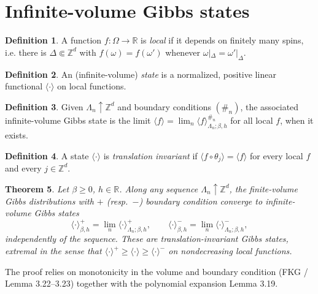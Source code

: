 \documentclass[11pt]{article}
\theoremstyle{plain}
\newtheorem{theorem}{Theorem}
\theoremstyle{definition}
\newtheorem{definition}[theorem]{Definition}
\theoremstyle{remark}
\newcommand{\Z}{\mathbb{Z}}
\newcommand{\R}{\mathbb{R}}
\newcommand{\fin}{\Subset}          %
\newcommand{\La}{\Lambda}
\newcommand{\bdy}{\#}
\newcommand{\avg}[1]{\langle #1 \rangle}
\newcommand{\meanp}[1]{\langle #1 \rangle^{+}}
\newcommand{\meanm}[1]{\langle #1 \rangle^{-}}
\begin{document}
\section{Infinite-volume Gibbs states}
\begin{definition}
A function $f:\Omega\to\R$ is \emph{local} if it depends on finitely many spins,
i.e. there is $\Delta\fin\Z^d$ with $f(\omega)=f(\omega')$ whenever
$\omega|_\Delta=\omega'|_\Delta$.
\end{definition}

\setcounter{theorem}{12}%
\begin{definition}
An (infinite-volume) \emph{state} is a normalized, positive linear functional
$\avg{\cdot}$ on local functions.
\end{definition}

\begin{definition}
Given $\La_n\uparrow\Z^d$ and boundary conditions $(\bdy_n)$, the associated
infinite-volume Gibbs state is the limit
$\avg{f}=\lim_n \avg{f}^{\bdy_n}_{\La_n;\beta,h}$ for all local $f$, when it
exists.
\end{definition}

\setcounter{theorem}{15}%
\begin{definition}
A state $\avg{\cdot}$ is \emph{translation invariant} if
$\avg{f\circ\theta_j}=\avg{f}$ for every local $f$ and every $j\in\Z^d$.
\end{definition}

\begin{theorem}
Let $\beta\ge0$, $h\in\R$. Along any sequence $\La_n\uparrow\Z^d$, the
finite-volume Gibbs distributions with $+$ (resp.\ $-$) boundary condition
converge to infinite-volume Gibbs states
\[
  \meanp{\cdot}_{\beta,h}=\lim_{n}\avg{\cdot}^{+}_{\La_n;\beta,h},
  \qquad
  \meanm{\cdot}_{\beta,h}=\lim_{n}\avg{\cdot}^{-}_{\La_n;\beta,h},
\]
independently of the sequence. These are translation-invariant Gibbs states,
extremal in the sense that $\meanp{\cdot}\ge\avg{\cdot}\ge\meanm{\cdot}$ on
nondecreasing local functions.
\end{theorem}
\noindent The proof relies on monotonicity in the volume and boundary condition
(FKG / Lemma 3.22--3.23) together with the polynomial expansion Lemma 3.19.

\end{document}

